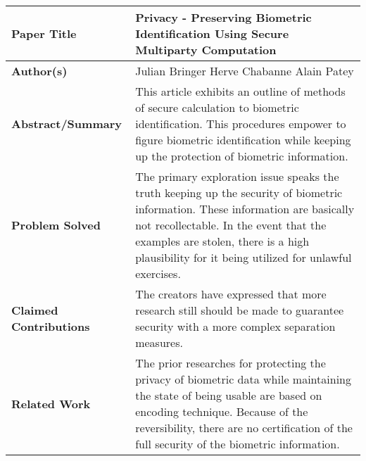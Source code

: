 \documentclass{report}
\begin{document}
\begin{tabular}{ |p{4cm}|p{6cm}| }
\hline
\textbf {\large Paper Title} & { \large Privacy - Preserving Biometric Identification Using Secure Multiparty Computation} \\
\hline
\textbf {\large Author(s)} & {\large Julian Bringer \newline Herve Chabanne \newline Alain Patey } \\
\hline
\textbf {\large Abstract/Summary} & {\large This article exhibits an outline of methods of secure calculation to biometric identification. This procedures empower to figure biometric identification while keeping up the protection of biometric information. } \\
\hline
\textbf {\large Problem Solved} & {\large The primary exploration issue speaks the truth keeping up the security of biometric information. These information are basically not recollectable. In the event that the examples are stolen, there is a high plausibility for it being utilized for unlawful exercises. } \\
\hline
\textbf {\large Claimed Contributions} & {\large The creators have expressed that more research still should be made to guarantee security with a more complex separation measures. } \\
\hline
\textbf {\large Related Work} & {\large The prior researches for protecting the privacy of biometric data while maintaining the state of being usable are based on encoding technique. Because of the reversibility, there are no certification of the full security of the biometric information. } \\
\hline
\end{tabular}
\end{document}
